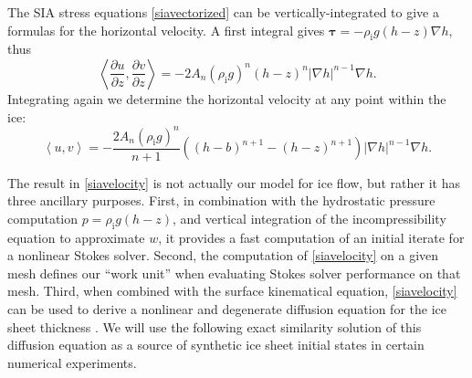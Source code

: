 \documentclass[letterpaper,final,12pt,reqno]{amsart}
\newcommand{\grad}{\nabla}
\newcommand{\rhoi}{\rho_{\text{i}}}
\begin{document}
The SIA stress equations \eqref{siavectorized} can be vertically-integrated to give a formulas for the horizontal velocity.  A first integral gives $\bm{\tau} = - \rhoi g (h-z) \grad h$, thus
    $$\left<\frac{\partial u}{\partial z},\frac{\partial v}{\partial z}\right> = - 2 A_n (\rhoi g)^n (h-z)^n |\grad h|^{n-1} \grad h.$$
Integrating again we determine the horizontal velocity at any point within the ice:
\begin{equation}
\left<u,v\right> = - \frac{2 A_n (\rhoi g)^n}{n+1} \left((h-b)^{n+1} - (h-z)^{n+1}\right) |\grad h|^{n-1} \grad h.  \label{siavelocity}
\end{equation}

The result in \eqref{siavelocity} is not actually our model for ice flow, but rather it has three ancillary purposes.  First, in combination with the hydrostatic pressure computation $p=\rhoi g (h-z)$, and vertical integration of the incompressibility equation to approximate $w$, it provides a fast computation of an initial iterate for a nonlinear Stokes solver.  Second, the computation of \eqref{siavelocity} on a given mesh defines our ``work unit'' when evaluating Stokes solver performance on that mesh.  Third, when combined with the surface kinematical equation, \eqref{siavelocity} can be used to derive a nonlinear and degenerate diffusion equation for the ice sheet thickness \cite{Fowler1997}.  We will use the following exact similarity solution of this diffusion equation as a source of synthetic ice sheet initial states in certain numerical experiments.
\end{document}
